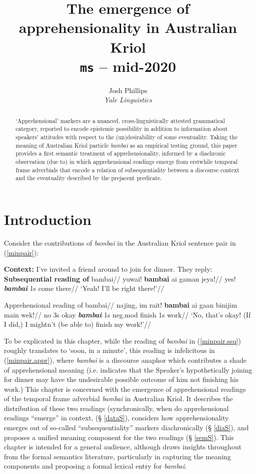 \documentclass[11pt]{article}
\date{}
\title{The emergence of apprehensionality in Australian Kriol\\{\footnotesize\texttt{ms} -- mid-{\scriptsize2020}}}
\author{Josh Phillips\\\textit{\normalsize Yale Linguistics}}
\begin{document}
	\maketitle
	\begin{abstract}
	`Apprehensional' markers are a nuanced, cross-linguistically attested grammatical category, reported to encode epistemic possibility in addition to information about speakers' attitudes with respect to the (un)desirability of some eventuality. Taking the meaning of Australian Kriol particle \textit{bambai} as an empirical testing ground, this paper provides a first semantic treatment of apprehensionality, informed by a diachronic observation (due to\citealp{Angelo2016}) in which apprehensional readings emerge from erstwhile temporal frame adverbials that encode a relation of {\sc subsequentiality} between a discourse context and the eventuality described by the prejacent predicate.
	\end{abstract}

\section{Introduction}\label{intro§} 
Consider the contributions of \textit{bambai} in the Australian Kriol sentence pair in (\ref{minpair}):

\pex\label{minpair}\textbf{Context:} \textup{I've invited a friend around to join for dinner. They reply:}
	\a\label{minpair.ssq}\begingl\glpreamble\textbf{Subsequential reading of} bambai//
		\gla yuwai! \textbf{bambai} ai gaman jeya!//
		\glb yes! \textbf{\textit{bambai}} 1s come there//
		\glft ‘Yeah! I’ll be right there!’//\endgl
		
	\a\begingl\glpreamble \label{minpair.appr}\textup{Apprehensional reading of} bambai//
		\gla najing, im rait! \textbf{bambai} ai gaan binijim main wek!//
		\glb no 3s okay \textbf{\textit{bambai}} 1s {\sc neg.mod} finish 1s work//
		\glft ‘No, that’s okay! (If I did,) I mightn’t (be able to) finish my work!'\trailingcitation{[GT~20170316]}//\endgl
\xe


To be explicated in this chapter, while the reading of \textit{bambai} in (\ref{minpair.ssq}) roughly translates to `soon, in a minute', this reading is infelicitous in (\ref{minpair.appr}), where \textit{bambai} is a discourse anaphor which contributes a shade of apprehensional meaning (i.e. indicates that the Speaker's hypothetically joining for dinner may have the undesirable possible outcome of him not finishing his work.) This chapter is concerned with the emergence of {\sc apprehensional} readings of the temporal frame adverbial \textit{bambai} in Australian Kriol. It describes the distribution of these two readings (synchronically, when do apprehensional readings ``emerge'' in context, (§ \ref{dataS}), considers how apprehensionality emerges out of so-called ``subsequentiality'' markers diachronically (§ \ref{diaS}), and proposes a unified meaning component for the two readings (§ \ref{semS}). This chapter is intended for a general audience, although draws insights throughout from the formal semantics literature, particularly in capturing the meaning components and proposing a formal lexical entry for \textit{bambai}.
\end{document}
